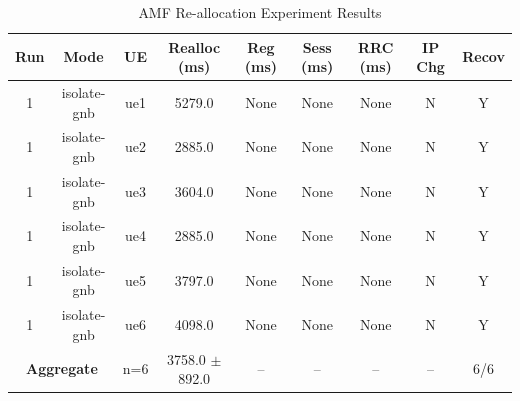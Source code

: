 \begin{table}[ht]
\centering
\begin{tabular}{|c|c|c|c|c|c|c|c|c|}
\hline
Run & Mode & UE & Realloc (ms) & Reg (ms) & Sess (ms) & RRC (ms) & IP Chg & Recov \\
\hline
1 & isolate-gnb & ue1 & 5279.0 & None & None & None & N & Y \\
1 & isolate-gnb & ue2 & 2885.0 & None & None & None & N & Y \\
1 & isolate-gnb & ue3 & 3604.0 & None & None & None & N & Y \\
1 & isolate-gnb & ue4 & 2885.0 & None & None & None & N & Y \\
1 & isolate-gnb & ue5 & 3797.0 & None & None & None & N & Y \\
1 & isolate-gnb & ue6 & 4098.0 & None & None & None & N & Y \\
\multicolumn{2}{|c|}{\textbf{Aggregate}} & n=6 & 3758.0 $\pm$ 892.0 & -- & -- & -- & -- & 6/6 \\
\hline
\end{tabular}
\caption{AMF Re-allocation Experiment Results}
\label{tab:amf_realloc}
\end{table}
